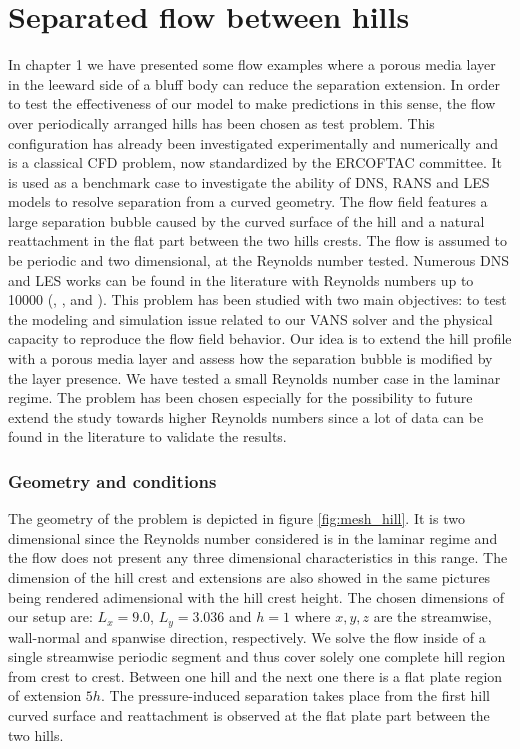 \section{Separated flow between hills}
In chapter 1 we have presented some flow examples where a porous media layer in the leeward side of a bluff body can reduce the separation extension. In order to test the effectiveness of our model to make predictions in this sense, the flow over periodically arranged hills has been chosen as test problem. This configuration has already been investigated experimentally and numerically and is a classical CFD problem, now standardized by the ERCOFTAC committee.
It is used as a benchmark case to investigate the ability of DNS, RANS and LES models to resolve separation from a curved geometry.
The flow field features a large separation bubble caused by the curved surface of the hill and a natural reattachment in the flat part between the two hills crests. 
The flow is assumed to be periodic and two dimensional, at the Reynolds number tested. Numerous DNS and LES works can be found in the literature with Reynolds numbers up to 10000 (\citet{chang2014simulations}, \citet{breuer2005issues} \cite{breuer2009flow}, \citet{almeida1993wake} and \citet{temmerman2001large}).
This problem has been studied with two main objectives: to test the modeling and simulation issue related to our VANS solver and the physical capacity to reproduce the flow field behavior. 
Our idea is to extend the hill profile with a porous media layer and assess how the separation bubble is modified by the layer presence.
We have tested a small Reynolds number case in the laminar regime. The problem has been chosen especially for the possibility to future extend the study towards higher Reynolds numbers since a lot of data can be found in the literature to validate the results.

\subsubsection{Geometry and conditions}
The geometry of the problem is depicted in figure \ref{fig:mesh_hill}. It is two dimensional since the Reynolds number considered is in the laminar regime and the flow does not present any three dimensional characteristics in this range. The dimension of the hill crest and extensions are also showed in the same pictures being rendered adimensional with the hill crest height. The chosen dimensions of our setup are: $L_x = 9.0$, $L_y = 3.036$ and $h = 1$ where $x,y,z$ are the streamwise, wall-normal and spanwise direction, respectively. We solve the flow inside of a single streamwise periodic segment and thus cover solely one complete hill region from crest to crest.
Between one hill and the next one there is a flat plate region of extension $5h$. The pressure-induced separation takes place from the first hill curved surface and reattachment is observed at the flat plate part between the two hills.

